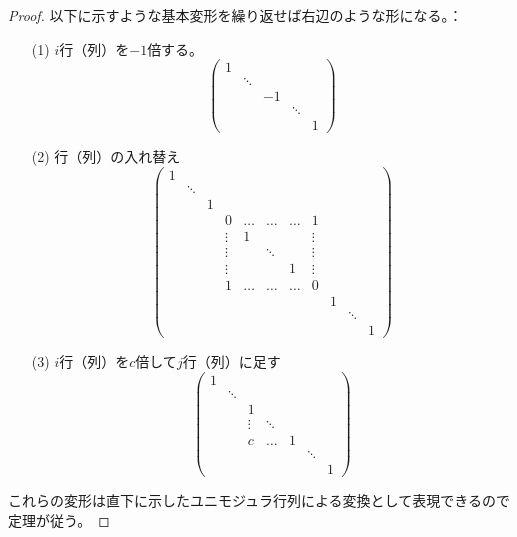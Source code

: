 \documentclass[uplatex]{jsarticle}
\begin{document}
\begin{proof}
  以下に示すような基本変形を繰り返せば右辺のような形になる。：
  \begin{itemize}
    \vspace{-0.5\baselineskip}
    \item[(1)] $i$行（列）を$-1$倍する。
    \begin{equation}
      \begin{pmatrix}
        1 & \\
          & \ddots \\
          &        & -1 \\
          &        &    & \ddots \\ 
          &        &    &        & 1
      \end{pmatrix}
    \end{equation}
    \item[(2)] 行（列）の入れ替え
    \begin{equation}
      \left( \begin{array}{ccccccccccc}
        1 \\
          & \ddots \\
          &        & 1 \\
          &        &   & 0      & \hdots & \hdots & \hdots & 1      \\ 
          &        &   & \vdots & 1      &        &        & \vdots \\
          &        &   & \vdots &        & \ddots &        & \vdots \\
          &        &   & \vdots &        &        & 1      & \vdots \\
          &        &   & 1      & \hdots & \hdots & \hdots & 0      \\
          &        &   &        &        &        &        &        & 1 \\
          &        &   &        &        &        &        &        &   & \ddots \\
          &        &   &        &        &        &        &        &   &        & 1 
      \end{array} \right)
    \end{equation}
    \item[(3)] $i$行（列）を$c$倍して$j$行（列）に足す
    \begin{equation}
      \begin{pmatrix}
        1 & \\
          & \ddots \\
          &        & 1      \\
          &        & \vdots & \ddots \\
          &        & c      & \hdots & 1 \\ 
          &        &        &        &   & \ddots \\
          &        &        &        &   &        & 1
      \end{pmatrix}
    \end{equation}
  \end{itemize}
  これらの変形は直下に示したユニモジュラ行列による変換として表現できるので定理が従う。
\end{proof}
\end{document}
